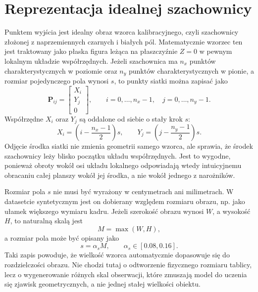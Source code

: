 \documentclass[12pt,a4paper]{report}
\begin{document}
\section{Reprezentacja idealnej szachownicy}
Punktem wyjścia jest idealny obraz wzorca kalibracyjnego, czyli szachownicy złożonej
z naprzemiennych czarnych i białych pól. Matematycznie wzorzec ten jest traktowany jako
płaska figura leżąca na płaszczyźnie $Z=0$ w pewnym lokalnym układzie współrzędnych. Jeżeli
szachownica ma $n_x$ punktów charakterystycznych w poziomie oraz $n_y$ punktów charakterystycznych
w pionie, a rozmiar pojedynczego pola wynosi $s$, to punkty siatki można zapisać jako
\begin{equation}
    \mathbf{P}_{ij} =
    \begin{bmatrix}
        X_i \\
        Y_j \\
        0
    \end{bmatrix},
    \qquad i = 0,\dots,n_x-1, \quad j = 0,\dots,n_y-1.
\end{equation}
Współrzędne $X_i$ oraz $Y_j$ są oddalone od siebie o stały krok $s$:
\begin{equation}
    X_i = \left(i - \frac{n_x-1}{2}\right)s,
    \qquad
    Y_j = \left(j - \frac{n_y-1}{2}\right)s.
\end{equation}
Odjęcie środka siatki nie zmienia geometrii samego wzorca, ale sprawia, że środek szachownicy
leży blisko początku układu współrzędnych. Jest to wygodne, ponieważ obroty wokół osi układu
lokalnego odpowiadają wtedy intuicyjnemu obracaniu całej planszy wokół jej środka, a nie wokół
jednego z narożników.

Rozmiar pola $s$ nie musi być wyrażony w centymetrach ani milimetrach. W datasetcie syntetycznym
jest on dobierany względem rozmiaru obrazu, np. jako ułamek większego wymiaru kadru. Jeżeli
szerokość obrazu wynosi $W$, a wysokość $H$, to naturalną skalą jest
\begin{equation}
    M = \max(W,H),
\end{equation}
a rozmiar pola może być opisany jako
\begin{equation}
    s = \alpha_s M,
    \qquad \alpha_s \in [0.08, 0.16].
\end{equation}
Taki zapis powoduje, że wielkość wzorca automatycznie dopasowuje się do rozdzielczości obrazu.
Nie chodzi tutaj o odtworzenie fizycznego rozmiaru tablicy, lecz o wygenerowanie różnych skal
obserwacji, które zmuszają model do uczenia się zjawisk geometrycznych, a nie jednej stałej
wielkości obiektu.
\end{document}
